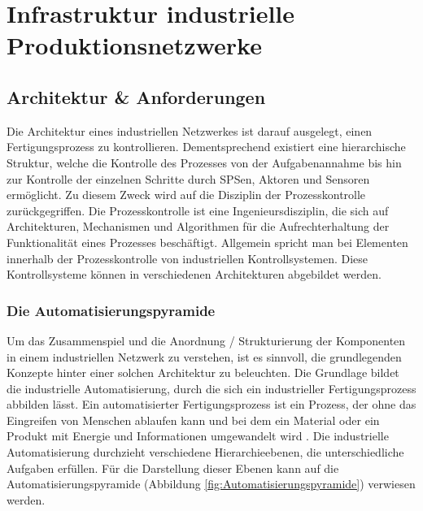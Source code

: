 \section{Infrastruktur industrielle Produktionsnetzwerke}


\subsection{Architektur \&  Anforderungen}
Die Architektur eines industriellen Netzwerkes ist darauf ausgelegt, einen Fertigungsprozess zu kontrollieren. Dementsprechend existiert eine hierarchische Struktur, welche die Kontrolle des Prozesses von der Aufgabenannahme bis hin zur Kontrolle der einzelnen Schritte durch SPSen, Aktoren und Sensoren ermöglicht. Zu diesem Zweck wird auf die Disziplin der Prozesskontrolle zurückgegriffen. Die Prozesskontrolle ist eine Ingenieursdisziplin, die sich auf Architekturen, Mechanismen und Algorithmen für die Aufrechterhaltung der Funktionalität eines Prozesses beschäftigt. Allgemein spricht man bei Elementen innerhalb der Prozesskontrolle von industriellen Kontrollsystemen. Diese Kontrollsysteme können in verschiedenen Architekturen abgebildet werden.

\subsubsection{Die Automatisierungspyramide}
Um das Zusammenspiel und die Anordnung / Strukturierung der Komponenten in einem industriellen Netzwerk zu verstehen, ist es sinnvoll, die grundlegenden Konzepte hinter einer solchen Architektur zu beleuchten. 
Die Grundlage bildet die industrielle Automatisierung, durch die sich ein industrieller Fertigungsprozess abbilden lässt.
Ein automatisierter Fertigungsprozess ist ein Prozess, der ohne das Eingreifen von Menschen ablaufen kann und bei dem ein Material oder ein Produkt mit Energie und Informationen umgewandelt wird \citep{Linke2017}. 
Die industrielle Automatisierung durchzieht verschiedene Hierarchieebenen, die unterschiedliche Aufgaben erfüllen. Für die Darstellung dieser Ebenen kann auf die Automatisierungspyramide (Abbildung \ref{fig:Automatisierungspyramide}) verwiesen werden.


